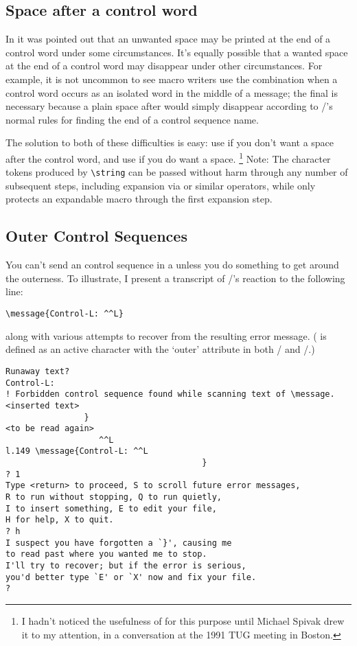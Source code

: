 {\begin{table}
\end{table}

\subsection{Space after a control word}

In   it was pointed out that an unwanted space may be
printed at the end of a control word under some circumstances. It's
equally possible that a wanted space at the end of a control word may
disappear under other circumstances. For example, it is not uncommon
to see macro writers use
the combination  when a
control word occurs as an isolated word in the middle of a message;
the final  is necessary because a plain space after
 would simply disappear according to \tex/'s normal
rules for finding the end of a control sequence name.

The solution to both of these difficulties is easy: use 
if you don't want a space after the control word, and use
 if you do want a space.%
\footnote{I hadn't noticed the usefulness of  for this
purpose until Michael Spivak drew it to my attention, in a
conversation at the 1991 TUG meeting in Boston.}
Note: The character tokens produced by \verb|\string| can be passed
without harm through any number of subsequent steps, including
expansion via  or similar operators, while 
only protects an expandable macro through the first expansion step.

\subsection{Outer Control Sequences}
\label{ss:outer}
You can't send an  control sequence in a 
unless you do something to get around the outerness.
To illustrate, I present
a transcript of \tex/'s reaction to the following line:
\begin{verbatim}
\message{Control-L: ^^L}
\end{verbatim}
along with various attempts to recover from the resulting error
message. ( is defined as an active character with the `outer'
attribute in both \plaintex/ and \latex/.)
\begin{verbatim}
Runaway text?
Control-L:
! Forbidden control sequence found while scanning text of \message.
<inserted text>
                }
<to be read again>
                   ^^L
l.149 \message{Control-L: ^^L
                                        }
? 1
Type <return> to proceed, S to scroll future error messages,
R to run without stopping, Q to run quietly,
I to insert something, E to edit your file,
H for help, X to quit.
? h
I suspect you have forgotten a `}', causing me
to read past where you wanted me to stop.
I'll try to recover; but if the error is serious,
you'd better type `E' or `X' now and fix your file.
?
\end{verbatim}

}
